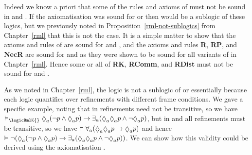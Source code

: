 Indeed we know a priori that some of the rules and axioms of \axiomRmlK{} must not be sound in \logicRmlKFF{} and \logicRmlKD{}.
If the axiomatisation \axiomRmlK{} was sound for \logicRmlKFF{} or \logicRmlKD{} then \logicRmlK{} would be a sublogic of these logics, but we previously noted in Proposition~\ref{rml-not-sublogics} from Chapter~\ref{rml} that this is not the case.
It is a simple matter to show that the axioms and rules of \axiomK{} are sound for \logicRmlKFF{} and \logicRmlKD{}, and the axioms and rules {\bf R}, {\bf RP}, and {\bf NecR} are sound for \logicRmlKFF{} and \logicRmlKD{} as they were shown to be sound for all variants of \logicRml{} in Chapter~\ref{rml}.
Hence some or all of {\bf RK}, {\bf RComm}, and {\bf RDist} must not be sound for \logicRmlKFF{} and \logicRmlKD{}. 

As we noted in Chapter~\ref{rml}, the logic \logicRmlK{} is not a sublogic of \logicRmlKFF{} or \logicRmlKD{} essentially because each logic quantifies over refinements with different frame conditions.
We gave a specific example, noting that in \logicRmlK{} refinements need not be transitive, so we have $\entails_\logicRmlK{} \possibleA (\lnot \atomP \land \possibleA \atomP) \implies \somerefsA (\possibleA \possibleA \atomP \land \lnot \possibleA \atomP)$, but in \logicRmlKFF{} and \logicRmlKD{} all refinements must be transitive, so we have $\entails \allrefsA (\possibleA \possibleA \atomP \implies \possibleA \atomP)$ and hence $
\entails \lnot (\possibleA (\lnot \atomP \land \possibleA \atomP) \implies \somerefsA (\possibleA \possibleA \atomP \land \lnot \possibleA \atomP))$.
We can show how this validity could be derived using the axiomatisation \axiomRmlK{}.
